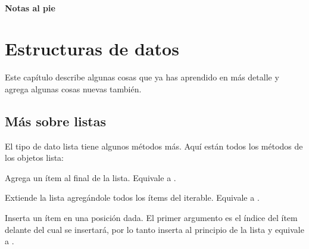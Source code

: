 \documentclass[a5paper,10pt,spanish]{sphinxmanual}
\begin{document}
\subsubsection*{Notas al pie}


\chapter{Estructuras de datos}
\label{\detokenize{tutorial/datastructures:data-structures}}\label{\detokenize{tutorial/datastructures:tut-structures}}\label{\detokenize{tutorial/datastructures::doc}}
\sphinxAtStartPar
Este capítulo describe algunas cosas que ya has aprendido en más detalle y agrega algunas cosas nuevas también.


\section{Más sobre listas}
\label{\detokenize{tutorial/datastructures:more-on-lists}}\label{\detokenize{tutorial/datastructures:tut-morelists}}
\sphinxAtStartPar
El tipo de dato lista tiene algunos métodos más. Aquí están todos los métodos de los objetos lista:


\begin{fulllineitems}
\sphinxAtStartPar
Agrega un ítem al final de la lista. Equivale a .

\end{fulllineitems}



\begin{fulllineitems}
\sphinxAtStartPar
Extiende la lista agregándole todos los ítems del iterable. Equivale a .

\end{fulllineitems}



\begin{fulllineitems}
\sphinxAtStartPar
Inserta un ítem en una posición dada. El primer argumento es el índice del ítem delante del cual se insertará, por lo tanto  inserta al principio de la lista y  equivale a .

\end{fulllineitems}
\end{document}
